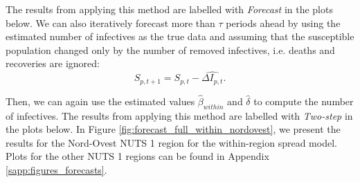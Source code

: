 \documentclass[12pt]{article}
\begin{document}
	The results from applying this method are labelled with \textit{Forecast} in the plots below. We can also iteratively forecast more than $\tau$ periods ahead by using the estimated number of infectives as the true data and assuming that the susceptible population changed only by the number of removed infectives, i.e. deaths and recoveries are ignored:
	    \[S_{p, t+1} = S_{p,t} - \widehat{\Delta I_{p,t}}.\]
	    
	Then, we can again use the estimated values $\widehat{\beta}_{within}$ and $\widehat{\delta}$ to compute the number of infectives. The results from applying this method are labelled with \textit{Two-step} in the plots below. In Figure \ref{fig:forecast_full_within_nordovest}, we present the results for the Nord-Ovest NUTS 1 region for the within-region spread model. Plots for the other NUTS 1 regions can be found in Appendix \ref{sapp:figures_forecasts}.
	
\end{document}

